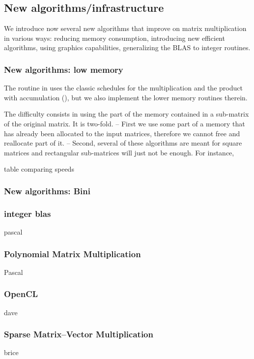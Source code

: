 \subsection{New algorithms/infrastructure}
%
We introduce now several new algorithms that improve on matrix multiplication
in various ways: reducing memory consumption, introducing new efficient
algorithms, using graphics capabilities, generalizing the BLAS to integer
routines.
%
\subsubsection{New algorithms: low memory}
%
The routine \fgemm in \fflas uses the classic schedules for the multiplication and
the product with accumulation (\cf \cite{Boyer:2009:sched}), but we also
implement the lower memory routines therein.
%
\par
%
The difficulty consists in using the part of the memory contained in a
sub-matrix of the original matrix. It is two-fold. -- First we use some part
of a memory that has already been allocated to the input matrices, therefore
we cannot free and reallocate part of it. -- Second, several of these algorithms
are meant for square matrices and rectangular sub-matrices will just not be enough.
For instance,
%
\par
%
\danger table comparing speeds
%
\subsubsection{New algorithms: Bini}
\cite{BD:2014:Bini}
%
%
%
\subsubsection{integer blas}
%
\danger pascal
%
\subsubsection{Polynomial Matrix Multiplication}
\danger Pascal
\subsubsection{OpenCL}
%
\danger dave
\subsubsection{Sparse Matrix--Vector Multiplication}
\danger brice
